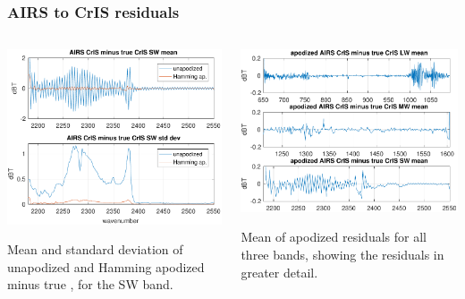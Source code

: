 \documentclass[10pt]{beamer}
\begin{document}
\begin{frame}
\frametitle{AIRS to CrIS residuals}
\begin{columns}[t]
\begin{column}{0.5\textwidth}
  \begin{centering}
  \includegraphics[width=\textwidth]{figures/a2cris_diff_SW.pdf}
  \end{centering}\vspace{3mm}
  Mean and standard deviation of unapodized and Hamming apodized
  {\airs} {\cris} minus true {\cris}, for the {\cris} SW band.

\end{column}
\begin{column}{0.5\textwidth}  
  \begin{centering}
  \includegraphics[width=\textwidth]{figures/a2cris_diff_all.pdf}
  \end{centering}\vspace{5mm}
  Mean of apodized residuals for all three {\cris} bands, showing
  the residuals in greater detail.

\end{column}
\end{columns}
\end{frame}
\end{document}
